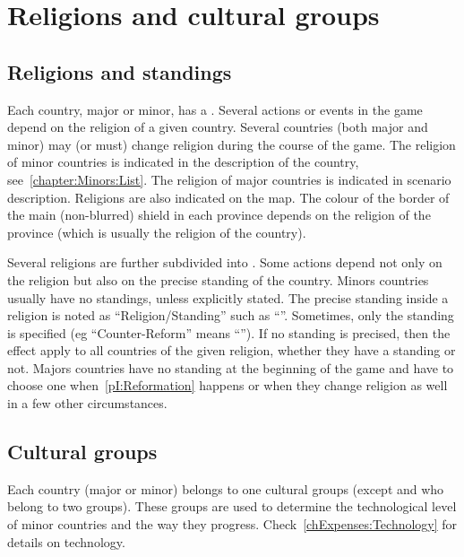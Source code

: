 \section{Religions and cultural groups}

\label{chThePowers:Religions}



\subsection{Religions and standings}

\aparag Each country, major or minor, has a .
\bparag Several actions or events in the game depend on the religion of a
given country.
\bparag Several countries (both major and minor) may (or must) change religion
during the course of the game.
\bparag The religion of minor countries is indicated in the description of the
country, see~\ref{chapter:Minors:List}. The religion of major countries is
indicated in scenario description.
\bparag Religions are also indicated on the map. The colour of the border of
the main (non-blurred) shield in each province depends on the religion of the
province (which is usually the religion of the country).

\aparag Several religions are further subdivided into . Some
actions depend not only on the religion but also on the precise standing of
the country.
\bparag Minors countries usually have no standings, unless explicitly stated.
\bparag The precise standing inside a religion is noted as
``Religion/Standing'' such as ``\CATHCR''. Sometimes, only the standing is
specified (eg ``Counter-Reform'' means ``\CATHCR'').
\bparag If no standing is precised, then the effect apply to all countries of
the given religion, whether they have a standing or not.
\bparag Majors countries have no standing at the beginning of the game and
have to choose one when~\ref{pI:Reformation} happens or when they change
religion as well in a few other circumstances.



\subsection{Cultural groups}

\aparag Each country (major or minor) belongs to one cultural groups (except
\POL and \RUS who belong to two groups).
\bparag These groups are used to determine the technological level of minor
countries and the way they progress. Check~\ref{chExpenses:Technology} for
details on technology.

